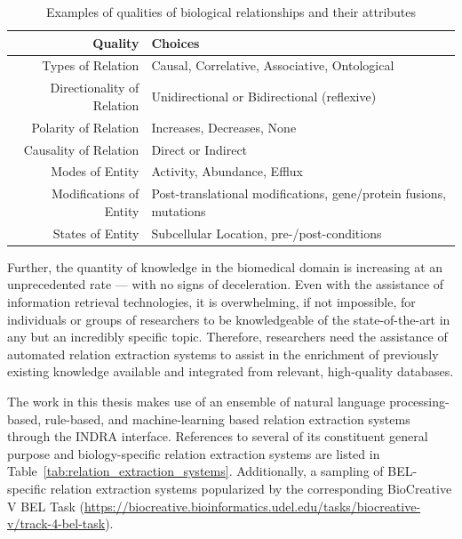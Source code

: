 \begin{table}
    \centering
    \begin{tabular}{ r l }
        Quality & Choices \\
        \hline
        Types of Relation & Causal, Correlative, Associative, Ontological \\
        Directionality of Relation & Unidirectional or Bidirectional (reflexive) \\
        Polarity of Relation & Increases, Decreases, None \\
        Causality of Relation & Direct or Indirect \\
        Modes of Entity & Activity, Abundance, Efflux  \\
        Modifications of Entity & Post-translational modifications, gene/protein fusions, mutations \\
        States of Entity & Subcellular Location, pre-/post-conditions \\

    \end{tabular}
    \caption{Examples of qualities of biological relationships and their attributes}
    \label{tab:biological_relations}
\end{table}

Further, the quantity of knowledge in the biomedical domain is increasing at an unprecedented rate — with no signs of deceleration.
Even with the assistance of information retrieval technologies, it is overwhelming, if not impossible, for individuals or groups of researchers to be knowledgeable of the state-of-the-art in any but an incredibly specific topic.
Therefore, researchers need the assistance of automated relation extraction systems to assist in the enrichment of previously existing knowledge available and integrated from relevant, high-quality databases.

The work in this thesis makes use of an ensemble of natural language processing-based, rule-based, and machine-learning based relation extraction systems through the \ac{INDRA} interface.
References to several of its constituent general purpose and biology-specific relation extraction systems are listed in Table~\ref{tab:relation_extraction_systems}.
Additionally, a sampling of BEL-specific relation extraction systems popularized by the corresponding BioCreative V BEL Task (\url{https://biocreative.bioinformatics.udel.edu/tasks/biocreative-v/track-4-bel-task}).


